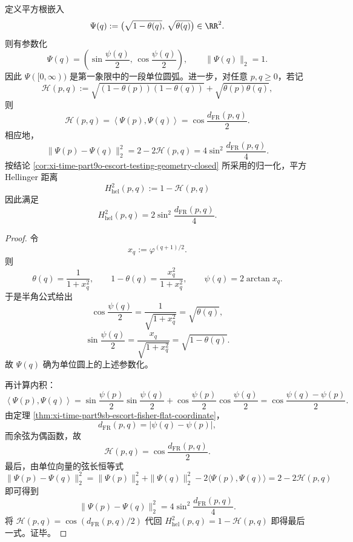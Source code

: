 \begin{theorem}\label{thm:xi-time-part9sb-escort-sqrt-circle-hellinger}
定义平方根嵌入
\[
\Psi(q):=\bigl(\sqrt{1-\theta(q)},\,\sqrt{\theta(q)}\bigr)\in\RR^2.
\]
则有参数化
\[
\Psi(q)
=
\left(
\sin\frac{\psi(q)}{2},
\,
\cos\frac{\psi(q)}{2}
\right),
\qquad
\|\Psi(q)\|_2=1.
\]
因此 \(\Psi([0,\infty))\) 是第一象限中的一段单位圆弧。进一步，对任意 \(p,q\ge 0\)，若记
\[
\mathcal H(p,q)
:=
\sqrt{(1-\theta(p))(1-\theta(q))}
+
\sqrt{\theta(p)\theta(q)},
\]
则
\[
\mathcal H(p,q)
=
\left\langle \Psi(p),\Psi(q)\right\rangle
=
\cos\frac{d_{\mathrm{FR}}(p,q)}{2}.
\]
相应地，
\[
\|\Psi(p)-\Psi(q)\|_2^2
=
2-2\mathcal H(p,q)
=
4\sin^2\frac{d_{\mathrm{FR}}(p,q)}{4}.
\]
按结论 \ref{cor:xi-time-part9o-escort-testing-geometry-closed} 所采用的归一化，平方 Hellinger 距离
\[
H_{\mathrm{hel}}^2(p,q):=1-\mathcal H(p,q)
\]
因此满足
\[
H_{\mathrm{hel}}^2(p,q)=2\sin^2\frac{d_{\mathrm{FR}}(p,q)}{4}.
\]
\end{theorem}
\begin{proof}
令
\[
x_q:=\varphi^{(q+1)/2}.
\]
则
\[
\theta(q)=\frac{1}{1+x_q^2},
\qquad
1-\theta(q)=\frac{x_q^2}{1+x_q^2},
\qquad
\psi(q)=2\arctan x_q.
\]
于是半角公式给出
\[
\cos\frac{\psi(q)}{2}
=
\frac{1}{\sqrt{1+x_q^2}}
=
\sqrt{\theta(q)},
\]
\[
\sin\frac{\psi(q)}{2}
=
\frac{x_q}{\sqrt{1+x_q^2}}
=
\sqrt{1-\theta(q)}.
\]
故 \(\Psi(q)\) 确为单位圆上的上述参数化。

再计算内积：
\[
\left\langle \Psi(p),\Psi(q)\right\rangle
=
\sin\frac{\psi(p)}{2}\sin\frac{\psi(q)}{2}
+
\cos\frac{\psi(p)}{2}\cos\frac{\psi(q)}{2}
=
\cos\frac{\psi(q)-\psi(p)}{2}.
\]
由定理 \ref{thm:xi-time-part9sb-escort-fisher-flat-coordinate}，
\[
d_{\mathrm{FR}}(p,q)=|\psi(q)-\psi(p)|,
\]
而余弦为偶函数，故
\[
\mathcal H(p,q)=\cos\frac{d_{\mathrm{FR}}(p,q)}{2}.
\]
最后，由单位向量的弦长恒等式
\[
\|\Psi(p)-\Psi(q)\|_2^2
=
\|\Psi(p)\|_2^2+\|\Psi(q)\|_2^2-2\langle \Psi(p),\Psi(q)\rangle
=
2-2\mathcal H(p,q)
\]
即可得到
\[
\|\Psi(p)-\Psi(q)\|_2^2
=
4\sin^2\frac{d_{\mathrm{FR}}(p,q)}{4}.
\]
将 \(\mathcal H(p,q)=\cos(d_{\mathrm{FR}}(p,q)/2)\) 代回
\(
H_{\mathrm{hel}}^2(p,q)=1-\mathcal H(p,q)
\)
即得最后一式。证毕。
\end{proof}

